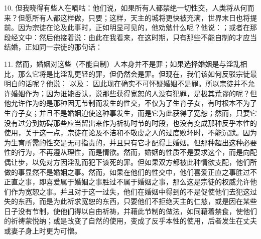 10. 但我晓得有些人在嘀咕：他们说，如果所有人都禁绝一切性交，人类将从何而来？但愿所有人都这样做，只要；这样，天主的城将更快被充满，世界末日也将提前。因为宗徒在论及此事时，正如明显可见的，他劝勉什么呢？他说：；或者在那段经文中：然后他接着说：由此在我看来，在这时期，只有那些不能自制的才应当结婚，正如同一宗徒的那句话：\par

11. 然而，婚姻对这些（不能自制）人本身并不是罪；如果选择婚姻是与淫乱相比，那么它将是比淫乱更轻的罪，但仍然会是罪。但现在，我们该如何反驳宗徒最明白的话呢？他说： 以及： 因此现在确实不可怀疑婚姻不是罪。所以宗徒并不允许婚姻作为；因为谁能否认，说那些获得宽恕的人没有犯罪，是极其荒谬的呢？但他允许作为的是那种因无节制而发生的性交，不仅为了生育子女，有时根本不为了生育子女；并且不是婚姻迫使这种事发生，而是它为此获得了宽恕；然而，只要它没有过分到妨碍那些应当留出来作为祈祷时节的时段，也没有变成那种反乎本性的使用，关于这一点，宗徒在论及不洁和不敬虔之人的过度败坏时，不能沉默。因为为生育所需的性交是无可指责的，并且只有它才配得上婚姻。但那种超出这种必要性的行为，不再遵从理性，而是情欲。然而，婚姻的性质不是要求这个，而是向配偶让步，以免对方因淫乱而犯下该死的罪。但如果双方都被此种情欲支配，他们所做的事显然不是婚姻之事。然而，如果在他们的性交中，他们喜爱正直之事胜过不正直之事，即喜爱属于婚姻之事胜过不属于婚姻之事，那么这是宗徒的权威允许他们作为宽恕之事。并且对于这一过失，他们在婚姻中得到的不是促使他们去犯这过失的东西，而是为此祈求宽恕的东西，只要他们不拒绝天主的仁慈，或是因在某些日子没有节制，使他们得以自由祈祷，并藉此节制的做法，如同藉着禁食，使他们的祈祷蒙悦纳；或是改变了自然的使用，变成了反乎本性的使用，后者发生在丈夫或妻子身上时更为可憎。\par

